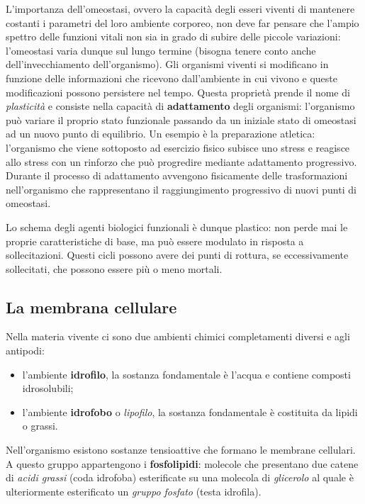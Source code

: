 \documentclass[]{article}
\begin{document}
L'importanza dell'omeostasi, ovvero la capacità degli esseri viventi di
mantenere costanti i parametri del loro ambiente corporeo, non deve far
pensare che l'ampio spettro delle funzioni vitali non sia in grado di
subire delle piccole variazioni: l'omeostasi varia dunque sul lungo
termine (bisogna tenere conto anche dell'invecchiamento dell'organismo).
Gli organismi viventi si modificano in funzione delle informazioni che
ricevono dall'ambiente in cui vivono e queste modificazioni possono
persistere nel tempo. Questa proprietà prende il nome di
\emph{plasticità} e consiste nella capacità di \textbf{adattamento}
degli organismi: l'organismo può variare il proprio stato funzionale
passando da un iniziale stato di omeostasi ad un nuovo punto di
equilibrio. Un esempio è la preparazione atletica: l'organismo che viene
sottoposto ad esercizio fisico subisce uno stress e reagisce allo stress
con un rinforzo che può progredire mediante adattamento progressivo.
Durante il processo di adattamento avvengono fisicamente delle
trasformazioni nell'organismo che rappresentano il raggiungimento
progressivo di nuovi punti di omeostasi.

Lo schema degli agenti biologici funzionali è dunque plastico: non perde
mai le proprie caratteristiche di base, ma può essere modulato in
risposta a sollecitazioni. Questi cicli possono avere dei punti di
rottura, se eccessivamente sollecitati, che possono essere più o meno
mortali.

\subsection{La membrana cellulare}\label{la-membrana-cellulare}

Nella materia vivente ci sono due ambienti chimici completamenti diversi
e agli antipodi:

\begin{itemize}
\itemsep1pt\parskip0pt
\item
  l'ambiente \textbf{idrofilo}, la sostanza fondamentale è l'acqua e
  contiene composti idrosolubili;
\item
  l'ambiente \textbf{idrofobo} o \emph{lipofilo}, la sostanza
  fondamentale è costituita da lipidi o grassi.
\end{itemize}

Nell'organismo esistono sostanze tensioattive che formano le membrane
cellulari. A questo gruppo appartengono i \textbf{fosfolipidi}: molecole
che presentano due catene di \emph{acidi grassi} (coda idrofoba)
esterificate su una molecola di \emph{glicerolo} al quale è
ulteriormente esterificato un \emph{gruppo fosfato} (testa idrofila).
\end{document}
